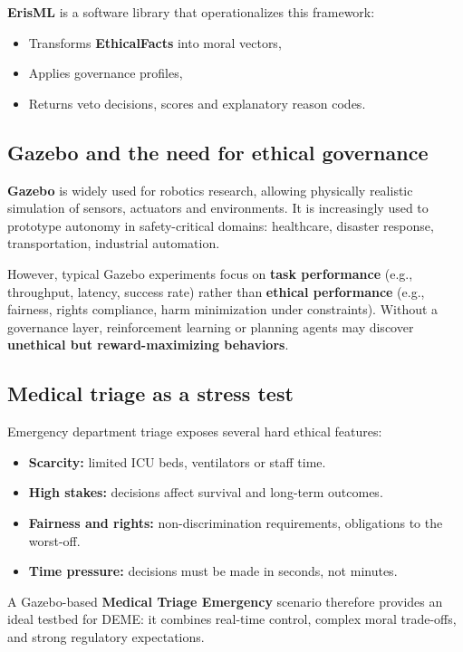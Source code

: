 \documentclass[11pt]{article}
\begin{document}
\textbf{ErisML} is a software library that operationalizes this framework:

\begin{itemize}
  \item Transforms \textbf{EthicalFacts} into moral vectors,
  \item Applies governance profiles,
  \item Returns veto decisions, scores and explanatory reason codes.
\end{itemize}

\subsection{Gazebo and the need for ethical governance}

\textbf{Gazebo} is widely used for robotics research, allowing physically realistic simulation of sensors, actuators and environments. It is increasingly used to prototype autonomy in safety-critical domains: healthcare, disaster response, transportation, industrial automation.

However, typical Gazebo experiments focus on \textbf{task performance} (e.g., throughput, latency, success rate) rather than \textbf{ethical performance} (e.g., fairness, rights compliance, harm minimization under constraints). Without a governance layer, reinforcement learning or planning agents may discover \textbf{unethical but reward-maximizing behaviors}.

\subsection{Medical triage as a stress test}

Emergency department triage exposes several hard ethical features:

\begin{itemize}
  \item \textbf{Scarcity:} limited ICU beds, ventilators or staff time.
  \item \textbf{High stakes:} decisions affect survival and long-term outcomes.
  \item \textbf{Fairness and rights:} non-discrimination requirements, obligations to the worst-off.
  \item \textbf{Time pressure:} decisions must be made in seconds, not minutes.
\end{itemize}

A Gazebo-based \textbf{Medical Triage Emergency} scenario therefore provides an ideal testbed for DEME: it combines real-time control, complex moral trade-offs, and strong regulatory expectations.
\end{document}
